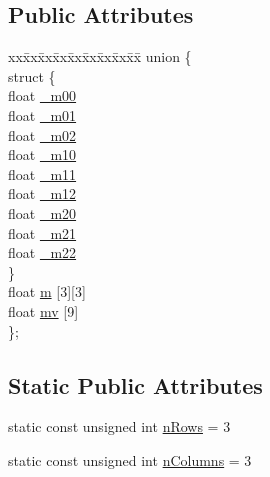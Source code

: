 \subsection*{Public Attributes}
\begin{DoxyCompactItemize}
\item 
\begin{tabbing}
xx\=xx\=xx\=xx\=xx\=xx\=xx\=xx\=xx\=\kill
union \{\\
\>struct \{\\
\>\>float \hyperlink{classh2_1_1_matrix3x3f_a804ba4cefdf8b57c96bd10b547274b85}{\_m00}\\
\>\>float \hyperlink{classh2_1_1_matrix3x3f_a9ac0a0fdec4ff38f2011eeeb0eec366c}{\_m01}\\
\>\>float \hyperlink{classh2_1_1_matrix3x3f_ab222ab67b315e9bd3740707bdb2bb244}{\_m02}\\
\>\>float \hyperlink{classh2_1_1_matrix3x3f_a0f0826127f2c70fb178fd76b85ed98de}{\_m10}\\
\>\>float \hyperlink{classh2_1_1_matrix3x3f_af0e704fa5344bb4455bc5a1c66bb3a36}{\_m11}\\
\>\>float \hyperlink{classh2_1_1_matrix3x3f_a756c178c190b53c5a4f009b8270c7336}{\_m12}\\
\>\>float \hyperlink{classh2_1_1_matrix3x3f_aabd955bbe77898ec6d280ee7d549b8fa}{\_m20}\\
\>\>float \hyperlink{classh2_1_1_matrix3x3f_a8d253a1eac9bfb0c2ad5a9988b5e1866}{\_m21}\\
\>\>float \hyperlink{classh2_1_1_matrix3x3f_a84ca111bbdcd71e7614bf0b9dfabccb8}{\_m22}\\
\>\} \\
\>float \hyperlink{classh2_1_1_matrix3x3f_a03a7fb8053dc3438756873d6474e96f5}{m} \mbox{[}3\mbox{]}\mbox{[}3\mbox{]}\\
\>float \hyperlink{classh2_1_1_matrix3x3f_acf196f033d8e70e39912a2069f93aef1}{mv} \mbox{[}9\mbox{]}\\
\}; \\

\end{tabbing}\end{DoxyCompactItemize}
\subsection*{Static Public Attributes}
\begin{DoxyCompactItemize}
\item 
static const unsigned int \hyperlink{classh2_1_1_matrix3x3f_ae3dad43b5f083f6850fa48ce346e29c1}{n\-Rows} = 3
\item 
static const unsigned int \hyperlink{classh2_1_1_matrix3x3f_afe657d9a533821132d4a87705ac13c58}{n\-Columns} = 3
\end{DoxyCompactItemize}
